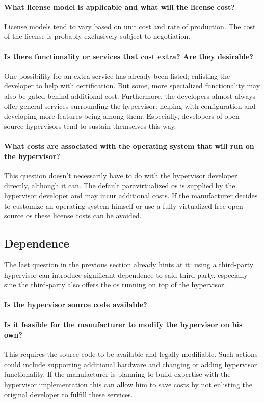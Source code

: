 \paragraph{What license model is applicable and what will the license cost?}
License models tend to vary based on unit cost and rate of production.
The cost of the license is probably exclusively subject to negotiation. 
\paragraph{Is there functionality or services that cost extra? Are they desirable?}
One possibility for an extra service has already been listed; enlisting the developer to help with certification. But some, more specialized functionality may also be gated behind additional cost. Furthermore, the developers almost always offer general services surrounding the hypervisor: helping with configuration and developing more features being among them. Especially, developers of open-source hypervisors tend to sustain themselves this way.
\paragraph{What costs are associated with the operating system that will run on the hypervisor?}
This question doesn't necessarily have to do with the hypervisor developer directly, although it can. The default paravirtualized \acrshort{os} is supplied by the hypervisor developer and may incur additional costs. If the manufacturer decides to customize an operating system himself or use a fully virtualized free open-source \acrshort{os} these license costs can be avoided. 
\subsection{Dependence}
The last question in the previous section already hints at it: using a third-party hypervisor can introduce significant dependence to said third-party, especially sine the third-party also offers the \acrshort{os} running on top of the hypervisor.
\paragraph{Is the hypervisor source code available?}
\paragraph{Is it feasible for the manufacturer to modify the hypervisor on his own?}
This requires the source code to be available and legally modifiable. Such actions could include supporting additional hardware and changing or adding hypervisor functionality. If the manufacturer is planning to build expertise with the hypervisor implementation this can allow him to save costs by not enlisting the original developer to fulfill these services.

